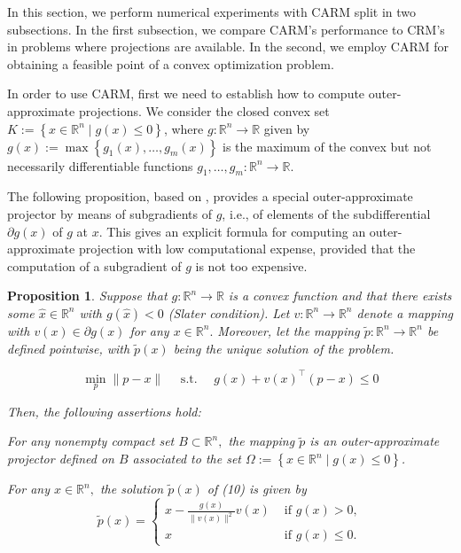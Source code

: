 \documentclass[smallextended,numbook,nospthms]{svjour3}
\theoremstyle{plain}
\newtheorem{proposition}[theorem]{Proposition}
\theoremstyle{definition}
\def\RR{\mathds R}
\begin{document}
In this section, we perform numerical experiments with CARM split in two subsections. In the first subsection, we compare CARM's performance to CRM's in problems where projections are available. In the second, we employ CARM for obtaining a feasible point of a convex optimization problem. 

In order to use CARM, first we need to establish how to compute outer-approximate projections. We consider the closed convex set $K:=\left\{x \in \RR^{n} \mid g(x) \leq 0\right\}$, where $g: \RR^{n} \rightarrow \RR$ given by $g(x):=\max \left\{g_{1}(x), \ldots, g_{m}(x)\right\}$ is the maximum of the convex but not necessarily differentiable functions $g_{1}, \ldots, g_{m}: \RR^{n} \rightarrow \RR$.

The following proposition, based on \cite{Fukushima:1983},  provides a special outer-approximate projector by means of subgradients of $g$, i.e., of elements of the subdifferential $\partial g(x)$ of $g$ at $x$. This gives an explicit formula for computing an outer-approximate projection with low computational expense, provided that the computation of a subgradient of $g$ is not too expensive.

\begin{proposition}\label{prop:approx proj formula}
	Suppose that $g: \RR^{n} \rightarrow \RR$ is a convex function and that there exists some $\hat{x} \in \RR^{n}$ with $g(\hat{x})<0$ (Slater condition). Let $v: \RR^{n} \rightarrow \RR^{n}$ denote a mapping with $v(x) \in \partial g(x)$ for any $x \in \RR^{n} .$ Moreover, let the mapping $\tilde{p}: \RR^{n} \rightarrow \RR^{n}$ be defined
	pointwise, with $\tilde{p}(x)$ being the unique solution of the problem.
	
	\begin{equation}
		\min _{p}\|p-x\| \quad \text { s.t. } \quad g(x)+v(x)^{\top}(p-x) \leq 0
	\end{equation}
	
	Then, the following assertions hold:
	\begin{listi}
		\item  For any nonempty compact set $B \subset \RR^{n},$ the mapping $\tilde{p}$ is an outer-approximate projector defined on $B$ associated to the set $\Omega:=\left\{x \in \RR^{n} \mid g(x) \leq 0\right\}$.
		
		\item  For any $x \in \RR^{n},$ the solution $\tilde{p}(x)$ of (10) is given by
		\[
		\tilde{p}(x)=\left\{\begin{array}{ll}
			x-\frac{g(x)}{\|v(x)\|^{2}} v(x) & \text { if } g(x)>0, \\
			x & \text { if } g(x) \leq 0.
		\end{array}\right.
		\]
	\end{listi}
\end{proposition}
\end{document}
